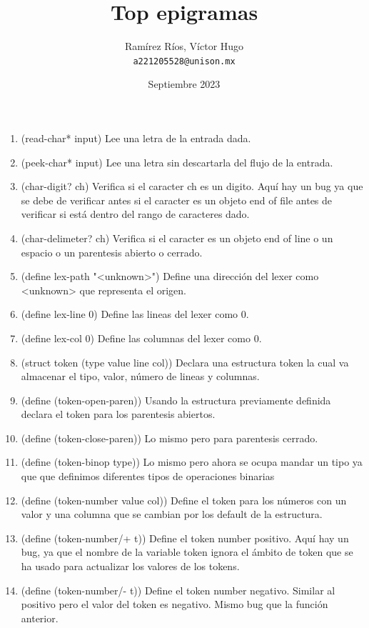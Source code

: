 \documentclass{article}
\title{Top epigramas}
\author{
  Ramírez Ríos, Víctor Hugo\\
  \texttt{a221205528@unison.mx}
}
\date{Septiembre 2023}
\begin{document}
\maketitle


\begin{enumerate}
    \item (read-char* input)
    Lee una letra de la entrada dada.
    \item (peek-char* input)
    Lee una letra sin descartarla del flujo de la entrada.
    \item (char-digit? ch)
    Verifica si el caracter ch es un digito. Aquí hay un bug ya que se debe de verificar antes si el caracter es un objeto end of file antes de verificar si está dentro del rango de caracteres dado.
    \item (char-delimeter? ch)
    Verifica si el caracter es un objeto end of line o un espacio o un parentesis abierto o cerrado.
    \item (define lex-path "<unknown>")
    Define una dirección del lexer como <unknown> que representa el origen.
    \item (define lex-line 0)
    Define las lineas del lexer como 0.
    \item (define lex-col 0)
    Define las columnas del lexer como 0.
    \item (struct token (type value line col))
    Declara una estructura token la cual va almacenar el tipo, valor, número de lineas y columnas.
    \item (define (token-open-paren))
    Usando la estructura previamente definida declara el token para los parentesis abiertos.
    \item (define (token-close-paren))
    Lo mismo pero para parentesis cerrado.
    \item (define (token-binop type))
    Lo mismo pero ahora se ocupa mandar un tipo ya que que definimos diferentes tipos de operaciones binarias
    \item (define (token-number value col))
    Define el token para los números con un valor y una columna que se cambian por los default de la estructura.
    \item (define (token-number/+ t))
    Define el token number positivo. Aquí hay un bug, ya que el nombre de la variable token ignora el ámbito de token que se ha usado para actualizar los valores de los tokens.
    \item (define (token-number/- t))
    Define el token number negativo. Similar al positivo pero el valor del token es negativo. Mismo bug que la función anterior.

\end{enumerate}
\end{document}
